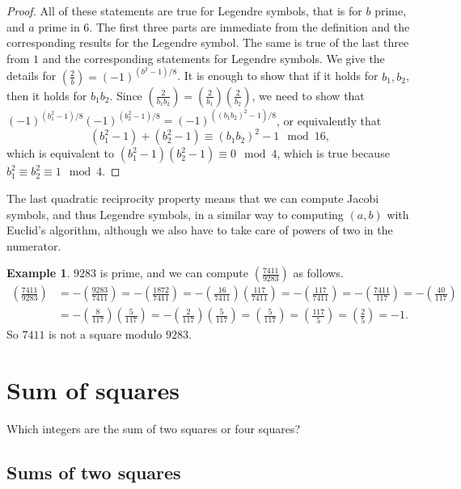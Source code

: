 \documentclass{article}
\newcommand{\rb}[1]{\left( #1 \right)}
\newcommand{\legendre}[2]{\rb{\tfrac{#1}{#2}}}
\theoremstyle{definition}\newtheorem{definition}{Definition}
\theoremstyle{definition}\newtheorem*{remark}{Remark}
\theoremstyle{definition}\newtheorem*{example}{Example}
\theoremstyle{definition}\newtheorem*{note}{Note}
\begin{document}
\begin{proof}
All of these statements are true for Legendre symbols, that is for $ b $ prime, and $ a $ prime in $ 6 $. The first three parts are immediate from the definition and the corresponding results for the Legendre symbol. The same is true of the last three from $ 1 $ and the corresponding statements for Legendre symbols. We give the details for $ \legendre{2}{b} = \rb{-1}^{\rb{b^2 - 1} / 8} $. It is enough to show that if it holds for $ b_1, b_2 $, then it holds for $ b_1b_2 $. Since $ \legendre{2}{b_1b_2} = \legendre{2}{b_1}\legendre{2}{b_2} $, we need to show that $ \rb{-1}^{\rb{b_1^2 - 1} / 8}\rb{-1}^{\rb{b_2^2 - 1} / 8} = \rb{-1}^{\rb{\rb{b_1b_2}^2 - 1} / 8} $, or equivalently that
$$ \rb{b_1^2 - 1} + \rb{b_2^2 - 1} \equiv \rb{b_1b_2}^2 - 1 \mod 16, $$
which is equivalent to $ \rb{b_1^2 - 1}\rb{b_2^2 - 1} \equiv 0 \mod 4 $, which is true because $ b_1^2 \equiv b_2^2 \equiv 1 \mod 4 $.
\end{proof}

The last quadratic reciprocity property means that we can compute Jacobi symbols, and thus Legendre symbols, in a similar way to computing $ \rb{a, b} $ with Euclid's algorithm, although we also have to take care of powers of two in the numerator.

\begin{example}
$ 9283 $ is prime, and we can compute $ \legendre{7411}{9283} $ as follows.
\begin{align*}
\legendre{7411}{9283}
& = -\legendre{9283}{7411} = -\legendre{1872}{7411} = -\legendre{16}{7411}\legendre{117}{7411} = -\legendre{117}{7411} = -\legendre{7411}{117} = -\legendre{40}{117} \\
& = -\legendre{8}{117}\legendre{5}{117} = -\legendre{2}{117}\legendre{5}{117} = \legendre{5}{117} = \legendre{117}{5} = \legendre{2}{5} = -1.
\end{align*}
So $ 7411 $ is not a square modulo $ 9283 $.
\end{example}

\section{Sum of squares}

Which integers are the sum of two squares or four squares?

\subsection{Sums of two squares}
\end{document}
